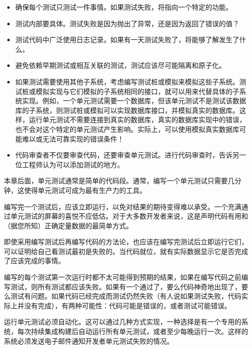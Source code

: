 \begin{itemize}
\item
确保每个测试只测试一件事情。如果测试失败，将指向一个特定的功能。

\item
测试内部要具体。测试失败是因为抛出了异常，还是因为返回了错误的值？

\item
测试代码中广泛使用日志记录。如果有一天测试失败了，将能够了解发生了什么。

\item
避免依赖早期测试或相互关联的测试，测试应该尽可能隔离和原子化。

\item
如果测试需要使用其他子系统，考虑编写测试桩或模拟来模拟这些子系统。测试桩或模拟实现与它们模拟的子系统相同的接口，就可以用来代替具体的子系统实现。例如，一个单元测试需要一个数据库，但该单元测试不是测试该数据库的子系统，则测试桩或模拟可以实现数据库接口，并模拟真实的数据库。这样，运行单元测试不需要连接到真实的数据库，真实的数据库实现中的错误，也不会对这个特定的单元测试产生影响。实际上，可以使用模拟真实数据库可能难以或无法可靠实现的错误条件！

\item
代码审查者不仅要审查代码，还要审查单元测试。进行代码审查时，告诉另一位工程师认为可以添加测试的地方。
\end{itemize}

本章后面，单元测试通常是简单的代码段。通常，编写一个单元测试只需要几分钟，这使得单元测试可成为最有生产力的工具。


编写完一个测试后，应该立即运行，以免对结果的期待变得难以承受。一个充满通过单元测试的屏幕的喜悦不应低估。对于大多数开发者来说，这是声明代码有用和（据您所知）正确定量数据的最简单方式。

即使采用编写测试后再编写代码的方法论，也应该在编写完测试后立即运行它们，可以证明给自己看测试最初是失败的。当代码就位，就有实际数据显示它是否完成了应该完成的事情。

编写的每个测试第一次运行时都不太可能得到预期的结果，如果在编写代码之前编写测试，则所有测试都应该失败。如果有一个通过了，要么代码神奇地出现了，要么测试有问题。如果代码已经完成而测试仍然失败（有人说如果测试失败，代码实际上并没有完成），有两种可能性：代码可能是错误的，或者测试可能错误。

运行单元测试必须自动化。这可以通过几种方式实现，一种选择是有一个专用的系统，每次持续集成构建后自动运行所有单元测试，或者至少每晚运行一次。这样的系统必须发送电子邮件通知开发者单元测试失败的情况。

